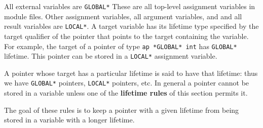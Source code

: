 \documentclass[12pt]{article}
\newcommand{\skey}[2]{{\rm \bfseries #1#2}}
\begin{document}
All external variables are {\tt *GLOBAL*}
These are all top-level assignment variables in module files.
Other assignment variables, all argument variables, and
and all result variables are {\tt *LOCAL*}.
A target variable has its lifetime type specified by the target
qualifier of the pointer that points to the target containing the
variable.  For example, the target of a pointer of type
{\tt ap *GLOBAL* int} has {\tt *GLOBAL*} lifetime.
This pointer can be stored in a {\tt *LOCAL*} assignment variable.

A pointer whose target has a particular lifetime is said to have that lifetime:
thus we have {\tt *GLOBAL*} pointers, {\tt *LOCAL*} pointers, etc.
In general a pointer cannot be stored in a variable unless one of the
\skey{lifetime rule}s of this section permits it.

The goal of these rules is to keep a pointer with a given lifetime
from being stored in a variable with a longer lifetime.
\end{document}
